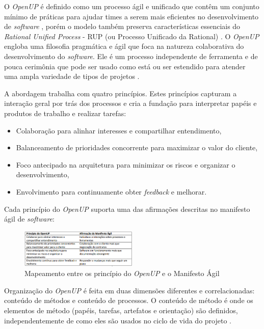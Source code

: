 \documentclass{acm_proc_article-sp}
\begin{document}
O \textit{OpenUP} é definido como um processo ágil e unificado que contêm um conjunto mínimo de práticas para ajudar times a serem mais eficientes no desenvolvimento de \textit{software} \cite{openUP:agil}, porém o modelo também preserva características essenciais do \textit{Rational Unified Process} - RUP (ou Processo Unificado da Rational) \cite{openUP:hibrido}. O \textit{OpenUP} engloba uma filosofia pragmática e ágil que foca na natureza colaborativa do desenvolvimento do \textit{software}. Ele é um processo independente de ferramenta e de pouca cerimônia que pode ser usado como está ou ser estendido para atender uma ampla variedade de tipos de projetos \cite{openUP:agil}.

A abordagem trabalha com quatro princípios. Estes princípios capturam a interação geral por trás dos processos e cria a fundação para interpretar papéis e produtos de trabalho e realizar tarefas:

\begin{itemize}
\item Colaboração para alinhar interesses e compartilhar entendimento,
\item Balanceamento de prioridades concorrente para maximizar o valor do cliente,
\item Foco antecipado na arquitetura para minimizar os riscos e organizar o desenvolvimento,
\item Envolvimento para continuamente obter \textit{feedback} e melhorar.
\end{itemize}

Cada princípio do \textit{OpenUP} suporta uma das afirmações descritas no manifesto ágil de \textit{software}:

\begin{figure}[h]
\centering %
\includegraphics[width=0.5\textwidth]{tabela_prinOpen_manifesto.png} %
\caption{Mapeamento entre os princípio do \textit{OpenUP} e o Manifesto Ágil \cite{openUP:agil}}
\end{figure}

Organização do \textit{OpenUP} é feita em  duas dimensões diferentes e correlacionadas: conteúdo de métodos e conteúdo de processos. O conteúdo de método é onde os elementos de método (papéis, tarefas, artefatos e orientação) são definidos, independentemente de como eles são usados no ciclo de vida do projeto \cite{openUP:agil}.
\end{document}
